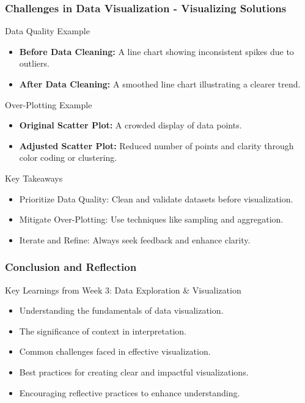 \documentclass[aspectratio=169]{beamer}
\begin{document}
\begin{frame}[fragile]
    \frametitle{Challenges in Data Visualization - Visualizing Solutions}
    \begin{block}{Data Quality Example}
        \begin{itemize}
            \item \textbf{Before Data Cleaning:} A line chart showing inconsistent spikes due to outliers.
            \item \textbf{After Data Cleaning:} A smoothed line chart illustrating a clearer trend.
        \end{itemize}
    \end{block}

    \begin{block}{Over-Plotting Example}
        \begin{itemize}
            \item \textbf{Original Scatter Plot:} A crowded display of data points.
            \item \textbf{Adjusted Scatter Plot:} Reduced number of points and clarity through color coding or clustering.
        \end{itemize}
    \end{block}

    \begin{block}{Key Takeaways}
        \begin{itemize}
            \item Prioritize Data Quality: Clean and validate datasets before visualization.
            \item Mitigate Over-Plotting: Use techniques like sampling and aggregation.
            \item Iterate and Refine: Always seek feedback and enhance clarity.
        \end{itemize}
    \end{block}
\end{frame}

\begin{frame}[fragile]
    \frametitle{Conclusion and Reflection}
    \begin{block}{Key Learnings from Week 3: Data Exploration \& Visualization}
        \begin{itemize}
            \item Understanding the fundamentals of data visualization.
            \item The significance of context in interpretation.
            \item Common challenges faced in effective visualization.
            \item Best practices for creating clear and impactful visualizations.
            \item Encouraging reflective practices to enhance understanding.
        \end{itemize}
    \end{block}
\end{frame}
\end{document}
